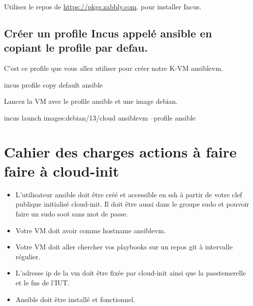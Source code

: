 Utilisez le repos de \url{https://pkgs.zabbly.com}. pour installer Incus.


\subsection{Créer un profile Incus appelé ansible en copiant le profile par defau.}

C'est ce profile que vous allez utiliser pour créer notre K-VM ansiblevm.

\begin{bashcode}
incus profile copy default ansible
\end{bashcode}

Lancez la VM avec le profile ansible et une image debian.
\begin{bashcode}
incus launch images:debian/13/cloud ansiblevm  --profile ansible
\end{bashcode}

\section{Cahier des charges actions à faire faire à cloud-init}

\begin{itemize}
\item L'utilisateur ansible doit être créé et accessible en ssh à partir de votre clef publique initialisé  cloud-init.  
Il doit être aussi dans le groupe sudo et pouvoir faire un sudo soot sans mot de passe.
\item Votre VM doit avoir comme hostname  ansiblevm.
\item Votre VM doit aller chercher vos playbooks sur un repos git à intervalle régulier.
\item L'adresse ip de la vm doit être fixée par cloud-init ainsi que la passtemerelle et le fns de l'IUT.
\item Ansible doit être installé et fonctionnel.
\end{itemize}

